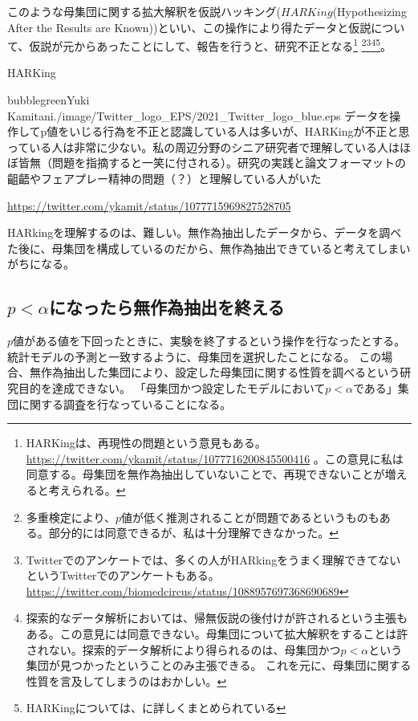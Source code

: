 このような母集団に関する拡大解釈を仮説ハッキング($HARKing$(Hypothesizing After the Results are Known))といい、この操作により得たデータと仮説について、仮説が元からあったことにして、報告を行うと、研究不正となる\footnote{
    HARKingは、再現性の問題という意見もある。
    \url{https://twitter.com/ykamit/status/1077716200845500416} 。この意見に私は同意する。母集団を無作為抽出していないことで、再現できないことが増えると考えられる。
}
\footnote{
    多重検定により、$p$値が低く推測されることが問題であるというものもある\cite{池田_功毅2016,中村_大輝2021sp20016}。部分的には同意できるが、私は十分理解できなかった。
}\footnote{
    Twitterでのアンケートでは、多くの人がHARkingをうまく理解できてないというTwitterでのアンケートもある。
    \url{https://twitter.com/biomedcircus/status/1088957697368690689}
}\footnote{
    探索的なデータ解析においては、帰無仮説の後付けが許されるという主張もある。この意見には同意できない。母集団について拡大解釈をすることは許されない。探索的データ解析により得られるのは、母集団かつ$p<\alpha$という集団が見つかったということのみ主張できる。
    これを元に、母集団に関する性質を言及してしまうのはおかしい。
}\footnote{
    HARKingについては、\cite{kerr1998harking}に詳しくまとめられている
}。



\begin{SMbox}{HARKing}
    \begin{rightbubbles}{bubblegreen}{Yuki Kamitani}{./image/Twitter_logo_EPS/2021_Twitter_logo_blue.eps}
    データを操作してp値をいじる行為を不正と認識している人は多いが、HARKingが不正と思っている人は非常に少ない。私の周辺分野のシニア研究者で理解している人はほぼ皆無（問題を指摘すると一笑に付される）。研究の実践と論文フォーマットの齟齬やフェアプレー精神の問題（？）と理解している人がいた
        \begin{flushright} 
            \small	\url{https://twitter.com/ykamit/status/1077715969827528705}
        \end{flushright}    
    \end{rightbubbles}

    HARkingを理解するのは、難しい。無作為抽出したデータから、データを調べた後に、母集団を構成しているのだから、無作為抽出できていると考えてしまいがちになる。
\end{SMbox}
  

\subsection{$p<\alpha$になったら無作為抽出を終える}
$p$値がある値を下回ったときに、実験を終了するという操作を行なったとする。
統計モデルの予測と一致するように、母集団を選択したことになる。
この場合、無作為抽出した集団により、設定した母集団に関する性質を調べるという研究目的を達成できない。
「母集団かつ設定したモデルにおいて$p<\alpha$である」集団に関する調査を行なっていることになる。

